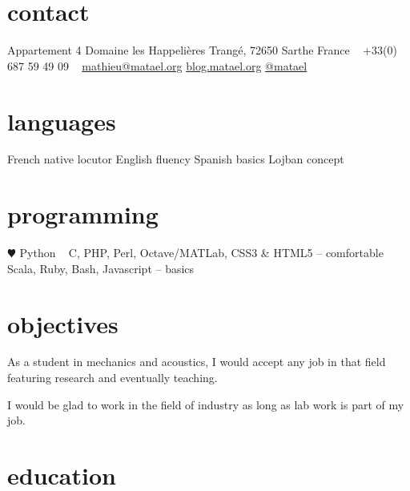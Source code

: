 \documentclass[]{friggeri-cv} %
\begin{document}


\begin{aside} %
\section{contact}
Appartement 4
Domaine les Happelières
Trangé, 72650 Sarthe
France
~
+33(0) 687 59 49 09
~
\href{mailto:mathieu@matael.org}{mathieu@matael.org}
\href{http://blog.matael.org}{blog.matael.org}
\href{http://twitter.com/matael}{@matael}
\section{languages}
French native locutor
English fluency
Spanish basics
Lojban concept
\section{programming}
{\color{red} $\varheartsuit$} Python
~
C, PHP, Perl, Octave/MATLab, CSS3 \& HTML5 -- comfortable
~
Scala, Ruby, Bash, Javascript -- basics
\end{aside}


\section{objectives}

As a student in mechanics and acoustics, I would accept any job in that field featuring research and eventually
teaching.

I would be glad to work in the field of industry as long as lab work is part of my job.


\section{education}
\end{document}

